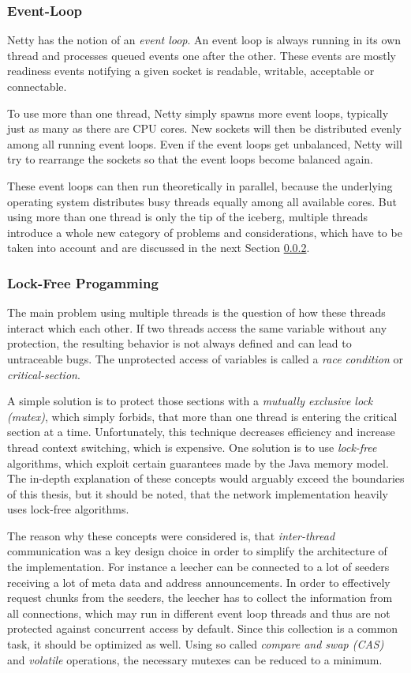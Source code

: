 \subsubsection{Event-Loop}
\label{module:core:conc:eventloop}
Netty has the notion of an \emph{event loop}. An event loop is always running in its own thread and processes queued events one after the other. These events are mostly readiness events notifying a given socket is readable, writable, acceptable or connectable.

To use more than one thread, Netty simply spawns more event loops, typically just as many as there are CPU cores. New sockets will then be distributed evenly among all running event loops. Even if the event loops get unbalanced, Netty will try to rearrange the sockets so that the event loops become balanced again.

These event loops can then run theoretically in parallel, because the underlying operating system distributes busy threads equally among all available cores. But using more than one thread is only the tip of the iceberg, multiple threads introduce a whole new category of problems and considerations, which have to be taken into account and are discussed in the next Section \ref{module:core:conc:lockfree}.


\subsubsection{Lock-Free Progamming}
\label{module:core:conc:lockfree}
The main problem using multiple threads is the question of how these threads interact which each other. If two threads access the same variable without any protection, the resulting behavior is not always defined and can lead to untraceable bugs. The unprotected access of variables is called a \emph{race condition} or \emph{critical-section}.

A simple solution is to protect those sections with a \emph{mutually exclusive lock (mutex)}, which simply forbids, that more than one thread is entering the critical section at a time. Unfortunately, this technique decreases efficiency and increase thread context switching, which is expensive. One solution is to use \emph{lock-free} algorithms, which exploit certain guarantees made by the Java memory model. The in-depth explanation of these concepts would arguably exceed the boundaries of this thesis, but it should be noted, that the network implementation heavily uses lock-free algorithms.

The reason why these concepts were considered is, that \emph{inter-thread} communication was a key design choice in order to simplify the architecture of the implementation. For instance a leecher can be connected to a lot of seeders receiving a lot of meta data and address announcements. In order to effectively request chunks from the seeders, the leecher has to collect the information from all connections, which may run in different event loop threads and thus are not protected against concurrent access by default. Since this collection is a common task, it should be optimized as well. Using so called \emph{compare and swap (CAS)} and \emph{volatile} operations, the necessary mutexes can be reduced to a minimum. 

